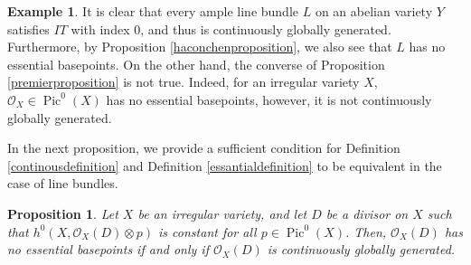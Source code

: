 \documentclass[sn-mathphys-num]{sn-jnl}%
\newtheorem{proposition}[theorem]{Proposition}
\theoremstyle{definition}
\newtheorem{example}[theorem]{Example}
\numberwithin{equation}{section}
\begin{document}
\begin{example}\label{ampleexample}
It is clear that every ample line bundle $L$ on an abelian variety $Y$ satisfies $IT$ with index $0$, and thus is continuously globally generated. Furthermore, by Proposition \ref{haconchenproposition}, we also see that $L$ has no essential basepoints. On the other hand, the converse of Proposition \ref{premierproposition} is not true. Indeed, for an irregular variety $X$,   $\mathcal{O}_{X} \in \operatorname{Pic}^{0}(X)$ has no essential basepoints, however, it is not continuously globally generated.
\end{example}
In the next proposition, we provide a sufficient condition for Definition \ref{continousdefinition} and Definition \ref{essantialdefinition} to be equivalent in the case of line bundles.
\begin{proposition}\label{deuxiemeproposition}
    Let $X$ be an irregular  variety, and let $D$ be a divisor on $X$ such that $h^{0}(X, \mathcal{O}_{X}(D) \otimes p)$ is constant for all $p \in \operatorname{Pic}^{0}(X)$. Then, $\mathcal{O}_{X}(D)$ has no essential basepoints if and only if $\mathcal{O}_{X}(D)$ is continuously globally generated.
\end{proposition}
\end{document}

